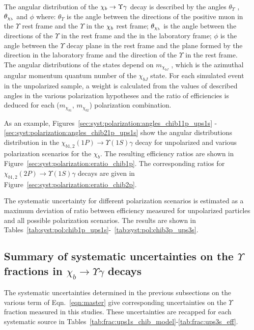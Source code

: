 The angular distribution of the $\chi_{b} \rightarrow \Upsilon \gamma$ decay is described
by the angles $\theta_{\Upsilon}$ , $\theta_{\chi_{b}}$ and $\phi$ where:
$\theta_{\Upsilon}$ is the angle between the directions of the positive muon in
the $\Upsilon$ rest frame and the $\Upsilon$ in the $\chi_{b}$ rest frame;
$\theta_{\chi_{b}}$ is the angle between the directions of the $\Upsilon$ in the
\chib rest frame and the \chib in the laboratory frame; $\phi$ is the angle
between the $\Upsilon$ decay plane in the \chib rest frame and the plane formed
by the \chib direction in the laboratory frame and the direction of the
$\Upsilon$ in the \chib rest frame. The angular distributions of the
\chib states depend on $m_{\chi_{bJ}}$ , which is the azimuthal angular
momentum quantum number of the $\chi_{bJ}$ state. For each simulated event in
the unpolarized sample, a weight is calculated from the values of described
angles in the various polarization hypotheses and the ratio of efficiencies is
deduced for each ($m_{\chi_{b1}}$, $m_{\chi_{b2}}$) polarization combination.

As an example, Figures~\ref{sec:syst:polarization:angles_chib11p_ups1s}
-\ref{sec:syst:polarization:angles_chib21p_ups1s} show the angular
distributions distribution in the $\chi_{b1,2}(1P) \to \Upsilon(1S) \gamma$
decay for unpolarized and various polarization scenarios for the $\chi_b$. The
resulting efficiency ratios are shown in
Figure~\ref{sec:syst:polarization:eratio_chib1p}. The corresponding ratios for
$\chi_{b1,2}(2P) \to \Upsilon(1S) \gamma$ decays are given in
Figure~\ref{sec:syst:polarization:eratio_chib2p}.






The systematic uncertainty for different polarization scenarios is estimated
as a maximum deviation of ratio between efficiency measured for unpolarized
particles and all possible polarization scenarios. The results  are
shown in Tables~\ref{tab:syst:pol:chib1p_ups1s}-~\ref{tab:syst:pol:chib3p_ups3s}.



\subsection{Summary of systematic uncertainties on the $\Upsilon$ fractions in $\chi_b \to \Upsilon \gamma$ decays}
The systematic uncertainties determined in the previous subsections on the
various term of Eqn.~\ref{eqn:master} give corresponding uncertainties on the
$\Upsilon$ fraction measured in this studies. These uncertainties are recapped
for each systematic source in
Tables~\ref{tab:frac:ups1s_chib_model}-\ref{tab:frac:ups3s_eff}.





